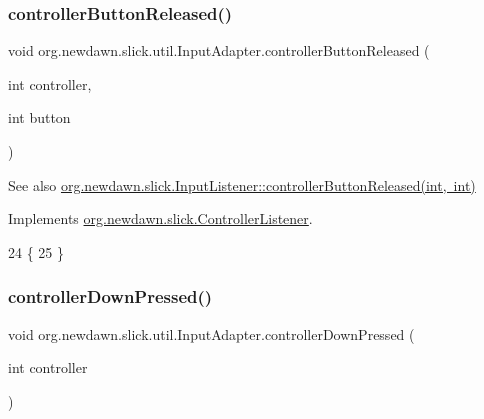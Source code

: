 \subsubsection{\texorpdfstring{controller\+Button\+Released()}{controllerButtonReleased()}}
{\footnotesize\ttfamily void org.\+newdawn.\+slick.\+util.\+Input\+Adapter.\+controller\+Button\+Released (\begin{DoxyParamCaption}\item[{int}]{controller,  }\item[{int}]{button }\end{DoxyParamCaption})\hspace{0.3cm}{\ttfamily [inline]}}

\begin{DoxySeeAlso}{See also}
\mbox{\hyperlink{interfaceorg_1_1newdawn_1_1slick_1_1_controller_listener_a34020453a6c40e12b149c334a4adc246}{org.\+newdawn.\+slick.\+Input\+Listener\+::controller\+Button\+Released(int, int)}} 
\end{DoxySeeAlso}


Implements \mbox{\hyperlink{interfaceorg_1_1newdawn_1_1slick_1_1_controller_listener_a34020453a6c40e12b149c334a4adc246}{org.\+newdawn.\+slick.\+Controller\+Listener}}.


\begin{DoxyCode}
24                                                                      \{
25     \}
\end{DoxyCode}
\mbox{\label{classorg_1_1newdawn_1_1slick_1_1util_1_1_input_adapter_af48b82447762dff2bc4b171d51468f1a}} 
\subsubsection{\texorpdfstring{controller\+Down\+Pressed()}{controllerDownPressed()}}
{\footnotesize\ttfamily void org.\+newdawn.\+slick.\+util.\+Input\+Adapter.\+controller\+Down\+Pressed (\begin{DoxyParamCaption}\item[{int}]{controller }\end{DoxyParamCaption})\hspace{0.3cm}{\ttfamily [inline]}}

